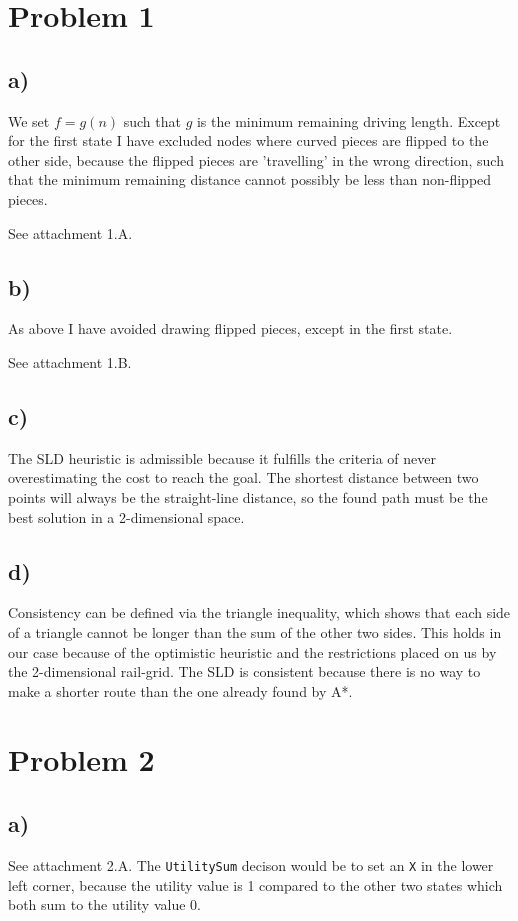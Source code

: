 \documentclass[12pt,a4paper]{article}
\author{Jens Egholm Pedersen}
\begin{document}
\section*{Problem 1}
\subsection*{a)}
We set $f = g(n)$ such that $g$ is the minimum remaining driving length.
Except for the first state I have excluded nodes where curved pieces
are flipped to the other side, because the flipped pieces are 'travelling'
in the wrong direction, such that the minimum remaining distance cannot possibly
be less than non-flipped pieces.

See attachment 1.A.

\subsection*{b)}
As above I have avoided drawing flipped pieces, except in the first state.

See attachment 1.B.

\subsection*{c)}
The SLD heuristic is admissible because it fulfills the criteria of never
overestimating the cost to reach the goal. The shortest distance between
two points will always be the straight-line distance, so the found path must
be the best solution in a 2-dimensional space.

\subsection*{d)}
Consistency can be defined via the triangle inequality, which shows that
each side of a triangle cannot be longer than the sum of the other two sides.
This holds in our case because of the optimistic heuristic and the restrictions
placed on us by the 2-dimensional rail-grid.
The SLD is consistent because there is no way to make a shorter route than the
one already found by A*.

\section*{Problem 2}
\subsection*{a)}
See attachment 2.A. The \texttt{UtilitySum} decison would be to set an
\texttt{X} in the lower left corner, because the utility value is 1
compared to the other two states which both sum to the utility value 0.
\end{document}
